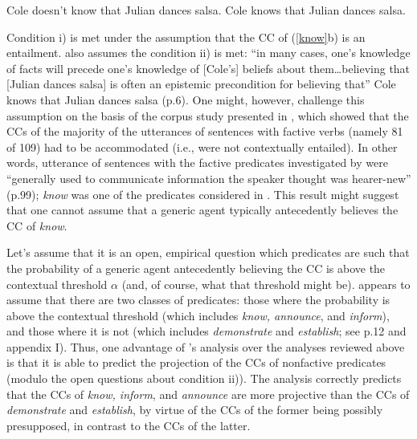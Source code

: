 \documentclass[11pt,fleqn]{article}
\newcommand{\6}{\mbox{$[\hspace*{-.6mm}[$}}
\newcommand{\9}{\mbox{$]\hspace*{-.6mm}]$}}
\newcommand{\citepos}[1]{\citeauthor{#1}'s \citeyear{#1}}
\begin{document}
\begin{exe}
\ex\label{know} 
\begin{xlist}
\ex Cole doesn't know that Julian dances salsa.
\ex Cole knows that Julian dances salsa.
\end{xlist}
\end{exe}

Condition i) is met under the assumption that the CC of (\ref{know}b) is an entailment. \citealt{schlenker2021} also assumes the condition ii) is met: ``in many cases, one's knowledge of facts will precede one's knowledge of [Cole's] beliefs about them\ldots believing that [Julian dances salsa] is often an epistemic precondition for believing that'' Cole knows that Julian dances salsa (p.6). One might, however, challenge this assumption on the basis of the corpus study presented in \citealt{spenader02}, which showed that the CCs of the majority of the utterances of sentences with factive verbs (namely 81 of 109) had to be accommodated (i.e., were not contextually entailed). In other words, utterance of sentences with the factive predicates investigated by \citet{spenader02} were ``generally used to communicate information the speaker thought was hearer-new'' (p.99); {\em know} was one of the predicates considered in \citealt{spenader02}. This result might suggest that one cannot assume that a generic agent typically antecedently believes the CC of {\em know}.

Let's assume that it is an open, empirical question which predicates are such that the probability of a generic agent antecedently believing the CC is above the contextual threshold $\alpha$ (and, of course, what that threshold might be). \citealt{schlenker2021} appears to assume that there are two classes of predicates: those where the probability is above the contextual threshold (which includes {\em know, announce}, and {\em inform}), and those where it is not (which includes {\em demonstrate} and {\em establish}; see p.12 and appendix I). Thus, one advantage of \citepos{schlenker2021} analysis over the analyses reviewed above is that it is able to predict the projection of the CCs of nonfactive predicates (modulo the open questions about condition ii)). The analysis correctly predicts that the CCs of \emph{know, inform}, and \emph{announce} are more projective than the CCs of \emph{demonstrate} and \emph{establish}, by virtue of the CCs of the former being possibly presupposed, in contrast to the CCs of the latter. 
\end{document}
